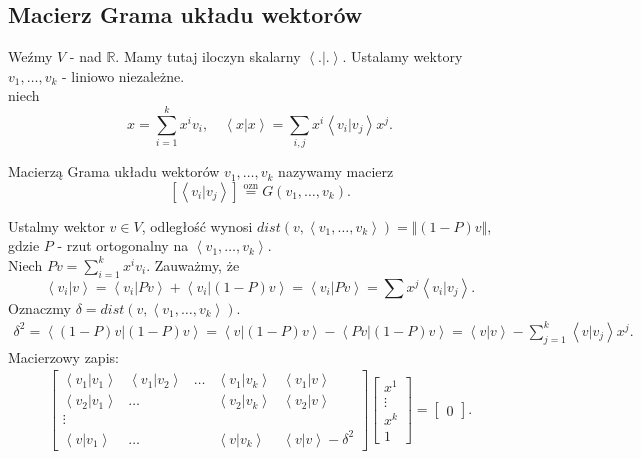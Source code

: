 \documentclass[../main.tex]{subfiles}
\begin{document}
\subsection{Macierz Grama układu wektorów}
Weźmy $V$ - nad $\mathbb{R}$. Mamy tutaj iloczyn skalarny $\left<.|. \right>$. Ustalamy wektory $v_1,\ldots,v_k$ - liniowo niezależne.\\
niech \[
x = \sum_{i=1}^k x^iv_i,\quad \left<x|x \right> = \sum_{i,j}x^i\left<v_i|v_j \right>x^j
.\]
\begin{definicja}
    Macierzą Grama układu wektorów $v_1,\ldots,v_k$ nazywamy macierz
    \[
        \left[ \left<v_i|v_j \right> \right] \overset{\text{ozn}}{=}  G(v_1,\ldots,v_k)
    .\]
\end{definicja}
    Ustalmy wektor $v\in V$, odległość wynosi $dist\left( v,\left<v_1,\ldots,v_k \right> \right) = \Vert (1-P)v \Vert$, gdzie $P$ - rzut ortogonalny na $\left<v_1,\ldots,v_k \right>$.\\
    Niech $P v = \sum_{i=1}^k x^i v_i$. Zauważmy, że
    \[
        \left<v_i|v \right> = \left<v_i|P v \right> + \left<v_i|(1-P)v \right> = \left<v_i | P v \right> = \sum x^j \left<v_i|v_j \right>
    .\]
    Oznaczmy $\delta = dist\left(v,\left<v_1,\ldots,v_k \right>\right)$. \\
    \begin{align*}
        \delta^2 = \left<(1-P)v|(1-P)v \right> = \left<v|(1-P)v \right> - \left<P v|(1-P) v \right> = \left<v|v \right> - \sum_{j=1}^k \left<v|v_j \right>x^j
    .\end{align*}
    Macierzowy zapis:
    \begin{align*}
        \begin{bmatrix} \left<v_1|v_1 \right>&\left<v_1|v_2 \right>&\ldots&\left<v_1|v_k \right>&\left<v_1|v \right> \\
            \left<v_2|v_1 \right>&\ldots&&\left<v_2|v_k \right>&\left<v_2|v \right>\\
            \vdots\\
            \left<v|v_1 \right>&\ldots&&\left<v|v_k \right> &\left<v|v \right>-\delta^2\end{bmatrix} \begin{bmatrix} x^1\\ \vdots \\ x^k \\ 1 \end{bmatrix} = \begin{bmatrix} 0 \end{bmatrix}
    .\end{align*}
\end{document}
